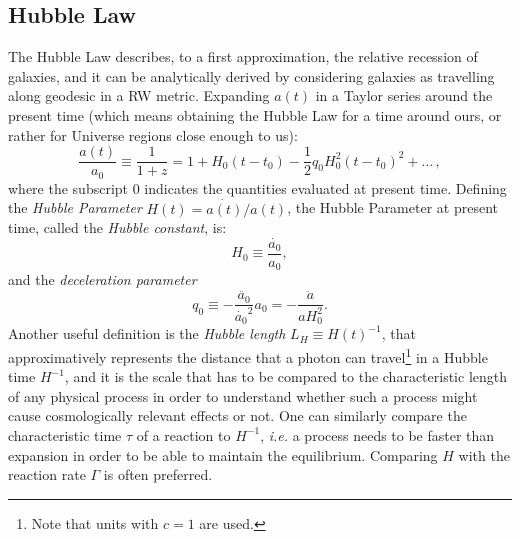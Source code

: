 \subsection{Hubble Law\label{hubblelaw}}
The Hubble Law describes, to a first approximation, the relative recession of galaxies, and it can be analytically derived by considering galaxies as travelling along geodesic in a RW metric. %
Expanding $a(t)$ in a Taylor series around the present time (which means obtaining the Hubble Law for a time around ours, or rather for Universe regions close enough to us):
\begin{equation}
\frac{a(t)}{a_0} \equiv \frac{1}{1+z} = 1 + H_0(t-t_0) - \frac{1}{2} q_0H_0^2(t-t_0)^2 + ...\,, \label{RW13}
\end{equation}where the subscript $0$ indicates the quantities evaluated at present time. Defining the \emph{Hubble Parameter} $H(t)=\dot{a(t)}/a(t)$, the Hubble Parameter at present time, called the \emph{Hubble constant}, is:
\begin{equation}
H_0 \equiv \frac{\dot{a_0}}{a_0},
\end{equation}and the \emph{deceleration parameter}
\begin{equation}
q_0\equiv -\frac{\ddot{a_0}}{\dot{a_0}^2} a_0 = -\frac{\ddot{a}}{a H_0^2}.
\end{equation}
Another useful definition is the \emph{Hubble length} $L_H \equiv H(t)^{-1}$, that approximatively represents the distance that a photon can travel\footnote{Note that units with $c=1$ are used.} in a Hubble time $H^{-1}$, and it is the scale that has to be compared to the characteristic length of any physical process in order to understand whether such a process might cause cosmologically relevant effects or not. One can similarly compare the characteristic time  $\tau$ of a reaction to $H^{-1}$, \emph{i.e.} a process needs to be faster than expansion in order to be able to maintain the equilibrium. Comparing $H$ with the reaction rate $\Gamma$ is often preferred.\\

